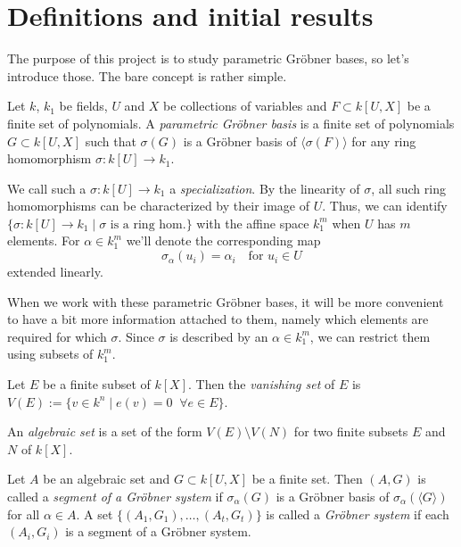 \documentclass[a4paper, 12pt]{article}
\theoremstyle{changedot}
\theoremstyle{changedotbreak}
\theoremstyle{nonumberplain}
\begin{document}
\section{Definitions and initial results}
The purpose of this project is to study parametric Gröbner bases, so let's introduce those. The bare concept is rather simple.

\begin{definition}
  Let $k$, $k_{1}$ be fields, $U$ and $X$ be collections of variables and $F \subset k[U, X]$ be a finite set of polynomials. A \textit{parametric Gröbner basis} is a finite set of polynomials $G \subset k[U, X]$ such that $\sigma(G)$ is a Gröbner basis of $\langle \sigma(F) \rangle$ for any ring homomorphism $\sigma : k[U] \to k_{1}$.
\end{definition}

We call such a $\sigma : k[U] \to k_{1}$ a \textit{specialization}. By the linearity of $\sigma$, all such ring homomorphisms can be characterized by their image of $U$. Thus, we can identify $\{\sigma : k[U] \to k_{1} \mid \sigma \text{ is a ring hom.}\}$ with the affine space $k_{1}^{m}$ when $U$ has $m$ elements. For $\alpha \in k_{1}^{m}$ we'll denote the corresponding map
\[\sigma_{\alpha}(u_{i}) = \alpha_{i} \quad \text{for $u_{i} \in U$}\] extended linearly.

When we work with these parametric Gröbner bases, it will be more convenient to have a bit more information attached to them, namely which elements are required for which $\sigma$. Since $\sigma$ is described by an $\alpha \in k_{1}^{m}$, we can restrict them using subsets of $k_{1}^{m}$.

\begin{definition}
  Let $E$ be a finite subset of $k[X]$. Then the \textit{vanishing set} of $E$ is $V(E) := \{v \in k^{n} \mid e(v) = 0 \;\; \forall e \in E\}$.

  An \textit{algebraic set} is a set of the form $V(E) \setminus V(N)$ for two finite subsets $E$ and $N$ of $k[X]$.
\end{definition}

\begin{definition}
  Let $A$ be an algebraic set and $G \subset k[U, X]$ be a finite set. Then $(A, G)$ is called a \textit{segment of a Gröbner system} if $\sigma_{\alpha}(G)$ is a Gröbner basis of $\sigma_{\alpha}(\langle G \rangle)$ for all $\alpha \in A$. A set $\{(A_{1}, G_{1}), \dots, (A_{t}, G_{t})\}$ is called a \textit{Gröbner system} if each $(A_{i}, G_{i})$ is a segment of a Gröbner system.
\end{definition}
\end{document}
